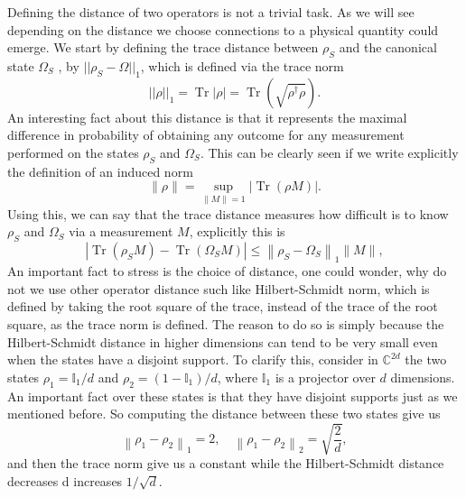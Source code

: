 \indent Defining the distance of two operators is not a trivial task. As we will see depending on the distance we choose connections to a physical quantity could emerge. We start by defining the trace distance between $\rho_S$ and the canonical state $\Omega_S$ , by  $||\rho_S-\Omega||_1$, which is defined via the trace norm
\begin{equation}
||\rho||_1=\operatorname{Tr}|\rho|=\operatorname{Tr}\left(\sqrt{\rho^{\dagger} \rho}\right).
\label{CH1:Trace_distance}
\end{equation}
\indent An interesting fact about this distance is that it represents the maximal difference in probability of obtaining any outcome for any measurement performed on the states $\rho_S$ and $\Omega_S$. This can be clearly seen if we write explicitly the definition of an induced norm
\begin{equation}
\|\rho\| = \sup_{\|M\|=1} |\operatorname{Tr}(\rho M)|.
\end{equation}
\indent Using this, we can say that the trace distance measures how difficult is to know $\rho_S$ and $\Omega_S$ via a measurement $M$, explicitly this is
\begin{equation}
\left|\operatorname{Tr}\left(\rho_{S} M\right)-\operatorname{Tr}\left(\Omega_{S} M\right)\right| \leq\left\|\rho_{S}-\Omega_{S}\right\|_{1}\|M\|,
\label{CH1:inequality1_tipicality}
\end{equation}
\indent An important fact to stress is the choice of distance, one could wonder, why do not we use other operator distance such like Hilbert-Schmidt norm, which is defined by taking the root square of the trace, instead of the trace of the root square, as the trace norm is defined. The reason to do so is simply because the Hilbert-Schmidt distance in higher dimensions can tend to be very small even when the states have a disjoint support\cite{facchi_quantum_2017}. To clarify this, consider in $\mathbb{C}^{2d}$ the two states $\rho_1 = \mathbb{I}_1/d$ and $\rho_2 =(1-\mathbb{I}_1)/d$, where $\mathbb{I}_1$ is a projector over $d$ dimensions. An important fact over these states is that they have disjoint supports just as we mentioned before. So computing the distance between these two states give us
\begin{equation}
\left\|\rho_{1}-\rho_{2}\right\|_{1}=2, \quad\left\|\rho_{1}-\rho_{2}\right\|_{2}=\sqrt{\frac{2}{d}},
\label{CH1:Example_1}
\end{equation}
and then the trace norm give us a constant while the Hilbert-Schmidt distance decreases d increases $1/\sqrt{d}$.\\

